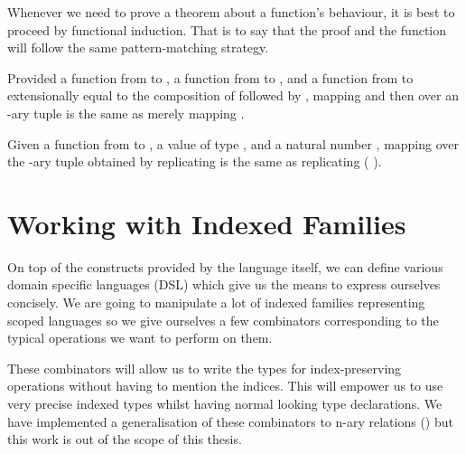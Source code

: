 
\begin{technique} Whenever we need to prove
a theorem about a function's behaviour, it is best to proceed by
functional induction. That is to say that the proof and the function
will follow the same pattern-matching strategy.
\end{technique}

\begin{lemma}
Provided a function  from  to ,
a function  from  to , and
a function  from  to  extensionally equal to the
composition of  followed by ,
mapping  and then  over an -ary
tuple  is the same as merely mapping .
\end{lemma}


\begin{lemma}
Given a function  from  to , a value  of type ,
and a natural number , mapping  over the -ary tuple obtained
by replicating  is the same as replicating ( ).
\end{lemma}




\section{Working with Indexed Families}
\label{sec:indexed-combinators}

On top of the constructs provided by the language itself, we can define various
domain specific languages (DSL) which give us the means to express ourselves
concisely. We are going to manipulate a lot of indexed families representing
scoped languages so we give ourselves a few combinators corresponding to the
typical operations we want to perform on them.

These combinators will allow us to write the types for index-preserving
operations without having to mention the indices. This will empower us
to use very precise indexed types whilst having normal looking type
declarations. We have implemented a generalisation of these combinators
to n-ary relations (\cite{DBLP:conf/icfp/Allais19}) but this work is out
of the scope of this thesis.



